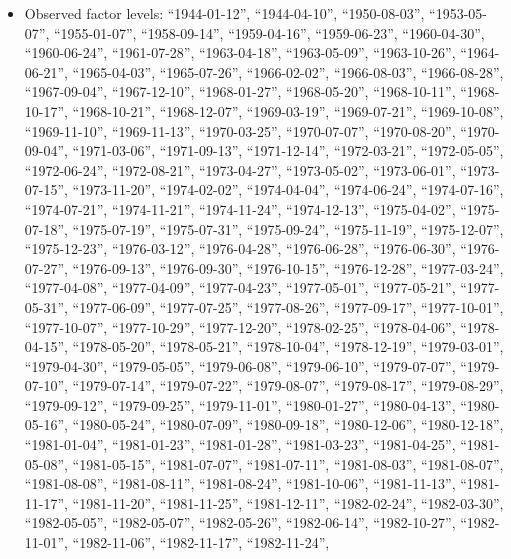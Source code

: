 \documentclass[
  letterpaper,
  DIV=11,
  numbers=noendperiod]{scrartcl}
\providecommand{\tightlist}{%
  \setlength{\itemsep}{0pt}\setlength{\parskip}{0pt}}
\begin{document}
\begin{itemize}
\tightlist
\item
  Observed factor levels: ``1944-01-12'', ``1944-04-10'',
  ``1950-08-03'', ``1953-05-07'', ``1955-01-07'', ``1958-09-14'',
  ``1959-04-16'', ``1959-06-23'', ``1960-04-30'', ``1960-06-24'',
  ``1961-07-28'', ``1963-04-18'', ``1963-05-09'', ``1963-10-26'',
  ``1964-06-21'', ``1965-04-03'', ``1965-07-26'', ``1966-02-02'',
  ``1966-08-03'', ``1966-08-28'', ``1967-09-04'', ``1967-12-10'',
  ``1968-01-27'', ``1968-05-20'', ``1968-10-11'', ``1968-10-17'',
  ``1968-10-21'', ``1968-12-07'', ``1969-03-19'', ``1969-07-21'',
  ``1969-10-08'', ``1969-11-10'', ``1969-11-13'', ``1970-03-25'',
  ``1970-07-07'', ``1970-08-20'', ``1970-09-04'', ``1971-03-06'',
  ``1971-09-13'', ``1971-12-14'', ``1972-03-21'', ``1972-05-05'',
  ``1972-06-24'', ``1972-08-21'', ``1973-04-27'', ``1973-05-02'',
  ``1973-06-01'', ``1973-07-15'', ``1973-11-20'', ``1974-02-02'',
  ``1974-04-04'', ``1974-06-24'', ``1974-07-16'', ``1974-07-21'',
  ``1974-11-21'', ``1974-11-24'', ``1974-12-13'', ``1975-04-02'',
  ``1975-07-18'', ``1975-07-19'', ``1975-07-31'', ``1975-09-24'',
  ``1975-11-19'', ``1975-12-07'', ``1975-12-23'', ``1976-03-12'',
  ``1976-04-28'', ``1976-06-28'', ``1976-06-30'', ``1976-07-27'',
  ``1976-09-13'', ``1976-09-30'', ``1976-10-15'', ``1976-12-28'',
  ``1977-03-24'', ``1977-04-08'', ``1977-04-09'', ``1977-04-23'',
  ``1977-05-01'', ``1977-05-21'', ``1977-05-31'', ``1977-06-09'',
  ``1977-07-25'', ``1977-08-26'', ``1977-09-17'', ``1977-10-01'',
  ``1977-10-07'', ``1977-10-29'', ``1977-12-20'', ``1978-02-25'',
  ``1978-04-06'', ``1978-04-15'', ``1978-05-20'', ``1978-05-21'',
  ``1978-10-04'', ``1978-12-19'', ``1979-03-01'', ``1979-04-30'',
  ``1979-05-05'', ``1979-06-08'', ``1979-06-10'', ``1979-07-07'',
  ``1979-07-10'', ``1979-07-14'', ``1979-07-22'', ``1979-08-07'',
  ``1979-08-17'', ``1979-08-29'', ``1979-09-12'', ``1979-09-25'',
  ``1979-11-01'', ``1980-01-27'', ``1980-04-13'', ``1980-05-16'',
  ``1980-05-24'', ``1980-07-09'', ``1980-09-18'', ``1980-12-06'',
  ``1980-12-18'', ``1981-01-04'', ``1981-01-23'', ``1981-01-28'',
  ``1981-03-23'', ``1981-04-25'', ``1981-05-08'', ``1981-05-15'',
  ``1981-07-07'', ``1981-07-11'', ``1981-08-03'', ``1981-08-07'',
  ``1981-08-08'', ``1981-08-11'', ``1981-08-24'', ``1981-10-06'',
  ``1981-11-13'', ``1981-11-17'', ``1981-11-20'', ``1981-11-25'',
  ``1981-12-11'', ``1982-02-24'', ``1982-03-30'', ``1982-05-05'',
  ``1982-05-07'', ``1982-05-26'', ``1982-06-14'', ``1982-10-27'',
  ``1982-11-01'', ``1982-11-06'', ``1982-11-17'', ``1982-11-24'',

\end{itemize}
\end{document}

